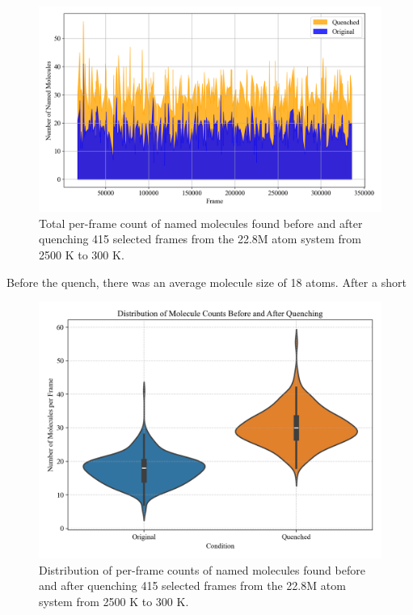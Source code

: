 \begin{figure}[!hp]
    \centering
    \includegraphics[width=1\linewidth]{Images/early_earth/mol_counts-before-after-quench.png}
    \caption[Line plot: total named molecules found before and after quenching large early earth system]{Total per-frame count of named molecules found before and after quenching 415 selected frames from the 22.8M atom system from 2500 K to 300 K.}
    \label{fig:ee_quench_lineplot}
\end{figure}

Before the quench, there was an average molecule size of 18 atoms. After a short 

\begin{figure}[!hp]
    \centering
    \includegraphics[width=1\linewidth]{Images/early_earth/violinplot-mol_counts-before-after-quench.png}
    \caption[Violin plot: total named molecules found before and after quenching large early earth system]{Distribution of per-frame counts of named molecules found before and after quenching 415 selected frames from the 22.8M atom system from 2500 K to 300 K.}
    \label{fig:ee_quench_violinplot}
\end{figure}


